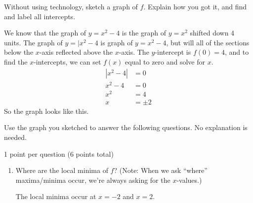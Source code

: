 \documentclass{article}
\begin{document}
\begin{enumerate}
\begin{enumerate}
\begin{enumerate}
      \begin{problem}[\stretch{5}]
        Without using technology, sketch a graph of $f$. Explain how you got it, and find and label all intercepts. 
      \end{problem}

      \begin{solution}
        We know that the graph of $y=x^2-4$ is the graph of $y=x^2$ shifted down 4 units. 
        The graph of $y=|x^2-4$ is graph of $y=x^2-4$, but will all of the sections
        below the $x$-axis reflected above the $x$-axis.
        The $y$-intercept is $f(0)=4$, and to find the $x$-intercepts, we can
        set $f(x)$ equal to zero and solve for $x$.
        \begin{align*}
          |x^2-4| &= 0 \\
          x^2 - 4 &= 0 \\
          x^2 &= 4 \\
          x &= \pm 2
        \end{align*}
        So the graph looks like this.
        \begin{center}
        \end{center}
      \end{solution}

    \end{enumerate}
    Use the graph you sketched to answer the following questions. No explanation is needed.

    \begin{grading}
      1 point per question (6 points total)
    \end{grading}

    \begin{enumerate}[resume]
    \item
      \begin{problem}[\vfill]
        Where are the local minima of $f$? (Note: When we ask ``where'' maxima/minima occur, we're always asking for the $x$-values.) 
      \end{problem}

      \begin{solution}
        The local minima occur at $x=-2$ and $x=2$.
      \end{solution}


\end{enumerate}
\end{enumerate}
\end{enumerate}
\end{document}
